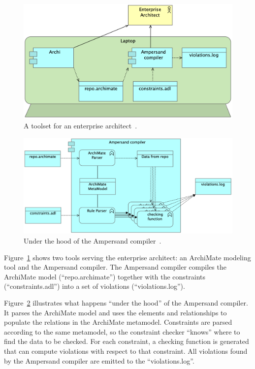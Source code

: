 \documentclass[sn-vancouver]{sn-jnl}%
\theoremstyle{thmstyleone}%
\theoremstyle{thmstyletwo}%
\theoremstyle{thmstylethree}%
\begin{document}
\begin{figure}[b]
 \centering
\includegraphics[clip=true, scale=0.19]{Figure4}
\caption{A toolset for an enterprise architect~\cite{iceis22}.}
\label{fig4}   %
\end{figure}
\begin{figure}[b]
 \centering
\includegraphics[clip=true, scale=0.16]{Figure5}
\caption{Under the hood of the Ampersand compiler~\cite{iceis22}.}
\label{fig5}
\end{figure}

Figure~\ref{fig4} shows two tools serving the enterprise architect: an ArchiMate modeling tool and the Ampersand compiler.
The Ampersand compiler compiles the ArchiMate model (``repo.archimate'') together with the constraints (``constraints.adl'') into a set of violations (``violations.log'').

Figure~\ref{fig5} illustrates what happens ``under the hood'' of the Ampersand compiler.
It parses the ArchiMate model and uses the elements and relationships to populate the relations in the ArchiMate metamodel.
Constraints are parsed according to the same metamodel, so the constraint checker ``knows'' where to find the data to be checked.
For each constraint, a checking function is generated that can compute violations with respect to that constraint.
All violations found by the Ampersand compiler are emitted to the ``violations.log''.
\end{document}
